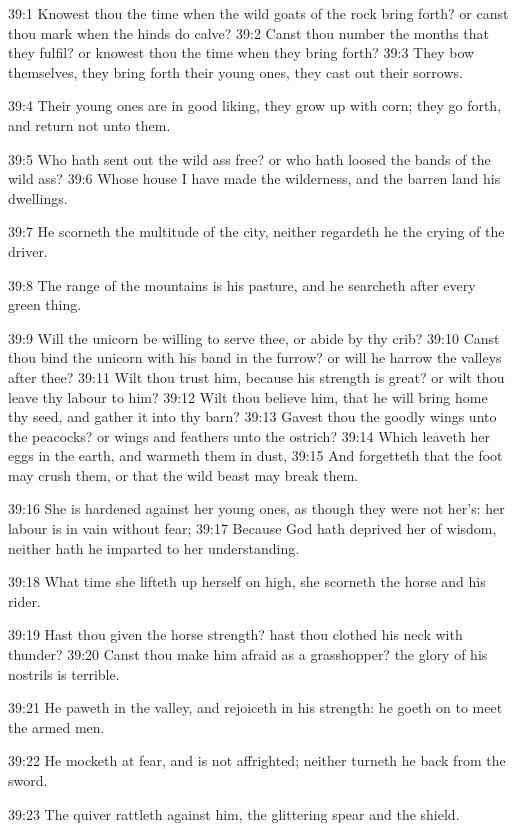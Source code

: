 39:1 Knowest thou the time when the wild goats of the rock bring
forth? or canst thou mark when the hinds do calve?  39:2 Canst thou
number the months that they fulfil? or knowest thou the time when they
bring forth?  39:3 They bow themselves, they bring forth their young
ones, they cast out their sorrows.

39:4 Their young ones are in good liking, they grow up with corn; they
go forth, and return not unto them.

39:5 Who hath sent out the wild ass free? or who hath loosed the bands
of the wild ass?  39:6 Whose house I have made the wilderness, and the
barren land his dwellings.

39:7 He scorneth the multitude of the city, neither regardeth he the
crying of the driver.

39:8 The range of the mountains is his pasture, and he searcheth after
every green thing.

39:9 Will the unicorn be willing to serve thee, or abide by thy crib?
39:10 Canst thou bind the unicorn with his band in the furrow? or will
he harrow the valleys after thee?  39:11 Wilt thou trust him, because
his strength is great? or wilt thou leave thy labour to him?  39:12
Wilt thou believe him, that he will bring home thy seed, and gather it
into thy barn?  39:13 Gavest thou the goodly wings unto the peacocks?
or wings and feathers unto the ostrich?  39:14 Which leaveth her eggs
in the earth, and warmeth them in dust, 39:15 And forgetteth that the
foot may crush them, or that the wild beast may break them.

39:16 She is hardened against her young ones, as though they were not
her's: her labour is in vain without fear; 39:17 Because God hath
deprived her of wisdom, neither hath he imparted to her understanding.

39:18 What time she lifteth up herself on high, she scorneth the horse
and his rider.

39:19 Hast thou given the horse strength? hast thou clothed his neck
with thunder?  39:20 Canst thou make him afraid as a grasshopper? the
glory of his nostrils is terrible.

39:21 He paweth in the valley, and rejoiceth in his strength: he goeth
on to meet the armed men.

39:22 He mocketh at fear, and is not affrighted; neither turneth he
back from the sword.

39:23 The quiver rattleth against him, the glittering spear and the
shield.

